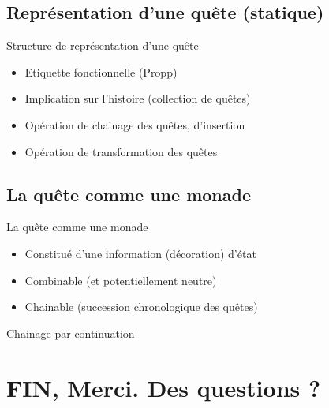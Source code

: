 \documentclass{beamer}
\begin{document}
\subsection{Représentation d'une quête (statique)}
\begin{frame}{Structure de représentation d'une quête}
  \begin{itemize}
  \item  Etiquette fonctionnelle (Propp)
    \item Implication sur l'histoire (collection de quêtes)
    \item Opération de chainage des quêtes, d'insertion
    \item Opération de transformation des quêtes
    \end{itemize}
\end{frame}

\subsection{La quête comme une monade}
\begin{frame}{La quête comme une monade}
  \begin{itemize}
  \item  Constitué d'une information (décoration) d'état
  \item Combinable (et potentiellement neutre)
  \item Chainable (succession chronologique des quêtes)
  \end{itemize}
Chainage par continuation
\end{frame}

\section{FIN, Merci. Des questions ?}
\end{document}
